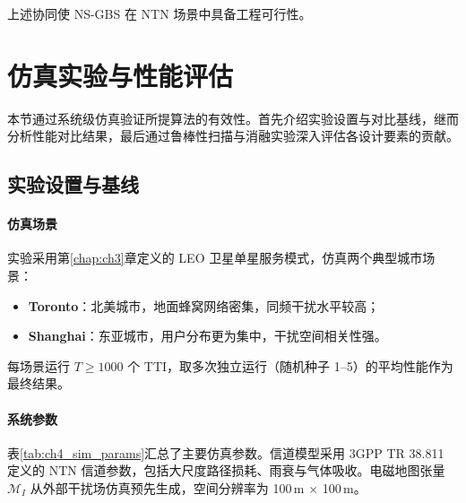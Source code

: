 \documentclass[type=master]{fduthesis}
\begin{document}
上述协同使 NS-GBS 在 NTN 场景中具备工程可行性。

\section{仿真实验与性能评估}
\label{sec:ch4_eval}

本节通过系统级仿真验证所提算法的有效性。首先介绍实验设置与对比基线，继而分析性能对比结果，最后通过鲁棒性扫描与消融实验深入评估各设计要素的贡献。

\subsection{实验设置与基线}
\label{subsec:ch4_exp_setup}

\paragraph{仿真场景}
实验采用第\ref{chap:ch3}章定义的 LEO 卫星单星服务模式，仿真两个典型城市场景：
\begin{itemize}
\item \textbf{Toronto}：北美城市，地面蜂窝网络密集，同频干扰水平较高；
\item \textbf{Shanghai}：东亚城市，用户分布更为集中，干扰空间相关性强。
\end{itemize}

每场景运行 $T \geq 1000$ 个 TTI，取多次独立运行（随机种子 1--5）的平均性能作为最终结果。

\paragraph{系统参数}
表\ref{tab:ch4_sim_params}汇总了主要仿真参数。信道模型采用 3GPP TR 38.811 定义的 NTN 信道参数，包括大尺度路径损耗、雨衰与气体吸收。电磁地图张量 $\mathcal{M}_I$ 从外部干扰场仿真预先生成，空间分辨率为 100\,m $\times$ 100\,m。
\end{document}

